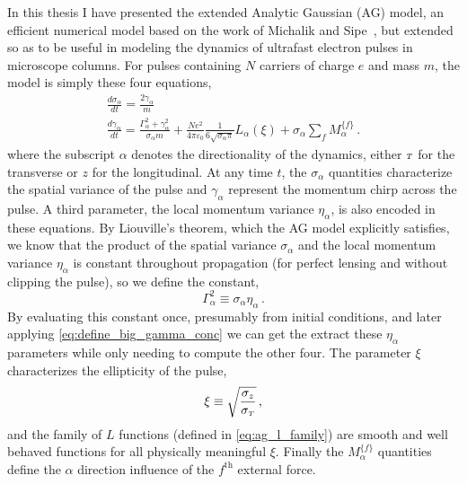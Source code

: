 In this thesis I have presented the extended Analytic Gaussian (AG) model, an efficient numerical model based on the work of Michalik and Sipe~\cite{michalik_analytic_2006}, but extended so as to be useful in modeling the dynamics of ultrafast electron pulses in microscope columns.
For pulses containing $N$ carriers of charge $e$ and mass $m$, the model is simply these four equations,
\begin{subequations}
\begin{gather}
  \frac{d\sigma_{\alpha}}{dt} = \frac{2\gamma_{\alpha}}{m} \\
  \frac{d\gamma_{\alpha}}{dt} = \frac{ \Gamma_{\alpha}^2 + \gamma_{\alpha}^2 }{\sigma_{\alpha} m}
    + \frac{N e^2}{4\pi\varepsilon_0} \frac{1}{6 \sqrt{\sigma_{\alpha}\pi}} L_{\alpha}(\xi) + \sigma_{\alpha} \sum\limits_{f} M_{\alpha}^{\lbrace f \rbrace} \label{eq:ag_model_gamma_conc} \,\text{.}
\end{gather}
\end{subequations}
where the subscript $\alpha$ denotes the directionality of the dynamics, either ${\scriptscriptstyle T}$ for the transverse or $z$ for the longitudinal.
At any time $t$, the $\sigma_{\alpha}$ quantities characterize the spatial variance of the pulse and $\gamma_{\alpha}$ represent the momentum chirp across the pulse.
A third parameter, the local momentum variance $\eta_{\alpha}$, is also encoded in these equations.
By Liouville's theorem, which the AG model explicitly satisfies, we know that the product of the spatial variance $\sigma_{\alpha}$ and the local momentum variance $\eta_{\alpha}$ is constant throughout propagation (for perfect lensing and without clipping the pulse), so we define the constant,
\begin{equation} \label{eq:define_big_gamma_conc}
  \Gamma_{\alpha}^2 \equiv \sigma_{\alpha} \eta_{\alpha} \,\text{.}
\end{equation}
By evaluating this constant once, presumably from initial conditions, and later applying \ref{eq:define_big_gamma_conc} we can get the extract these $\eta_{\alpha}$ parameters while only needing to compute the other four.
The parameter $\xi$ characterizes the ellipticity of the pulse,
\begin{equation}
  \xi \equiv \sqrt{\dfrac{\sigma_{z}}{\sigma_{{\scriptscriptstyle T}}}} \,\text{,}
\end{equation}
and the family of $L$ functions (defined in \ref{eq:ag_l_family}) are smooth and well behaved functions for all physically meaningful $\xi$.
Finally the $M_{\alpha}^{\lbrace f \rbrace}$ quantities define the $\alpha$ direction influence of the $f^{\text{th}}$ external force.

